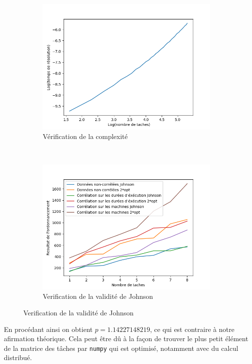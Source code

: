 \documentclass[a4paper, 10pt]{article}
\begin{document}
       	\begin{figure}[H]
			\centering
			\begin{subfigure}[b]{0.49\linewidth}
				\includegraphics[width=1\linewidth]{graphes/verification_Johnson.png}
				\caption{Vérification de la complexité}
				\label{fig:verifComp}
			\end{subfigure}
			~
			\begin{subfigure}[b]{0.49\linewidth}
				\includegraphics[width=1\linewidth]{graphes/validite_Johnson.png}
				\caption{Verification de la validité de Johnson}
				\label{fig:validiteJ}
			\end{subfigure}
		\end{figure}
                En procédant ainsi on obtient $p = 1.14227148219$, ce qui est contraire à notre afirmation théorique. Cela peut être dû à la façon de trouver le plus petit élément de la matrice des tâches par \texttt{numpy} qui est optimisé, notamment avec du calcul distribué.
                	
\end{document}
